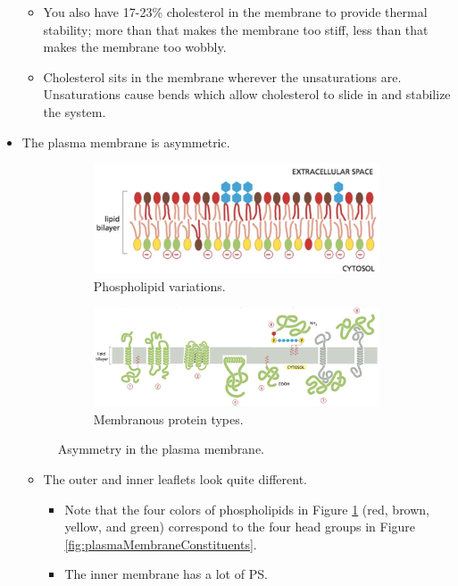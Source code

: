 \documentclass[../notes.tex]{subfiles}
\begin{document}
\begin{itemize}
\begin{itemize}
        \item You also have 17-23\% cholesterol in the membrane to provide thermal stability; more than that makes the membrane too stiff, less than that makes the membrane too wobbly.
        \item Cholesterol sits in the membrane wherever the unsaturations are. Unsaturations cause bends which allow cholesterol to slide in and stabilize the system.
    \end{itemize}
    \item The plasma membrane is asymmetric.
    \begin{figure}[H]
        \centering
        \begin{subfigure}[b]{\linewidth}
            \centering
            \includegraphics[width=0.4\linewidth]{../ExtFiles/plasmaMembraneAsyma.png}
            \caption{Phospholipid variations.}
            \label{fig:plasmaMembraneAsyma}
        \end{subfigure}
        \begin{subfigure}[b]{\linewidth}
            \centering
            \includegraphics[width=0.7\linewidth]{../ExtFiles/plasmaMembraneAsymb.png}
            \caption{Membranous protein types.}
            \label{fig:plasmaMembraneAsymb}
        \end{subfigure}
        \caption{Asymmetry in the plasma membrane.}
        \label{fig:plasmaMembraneAsym}
    \end{figure}
    \begin{itemize}
        \item The outer and inner leaflets look quite different.
        \begin{itemize}
            \item Note that the four colors of phospholipids in Figure \ref{fig:plasmaMembraneAsyma} (red, brown, yellow, and green) correspond to the four head groups in Figure \ref{fig:plasmaMembraneConstituents}.
            \item The inner membrane has a lot of PS.

\end{itemize}
\end{itemize}
\end{itemize}
\end{document}
